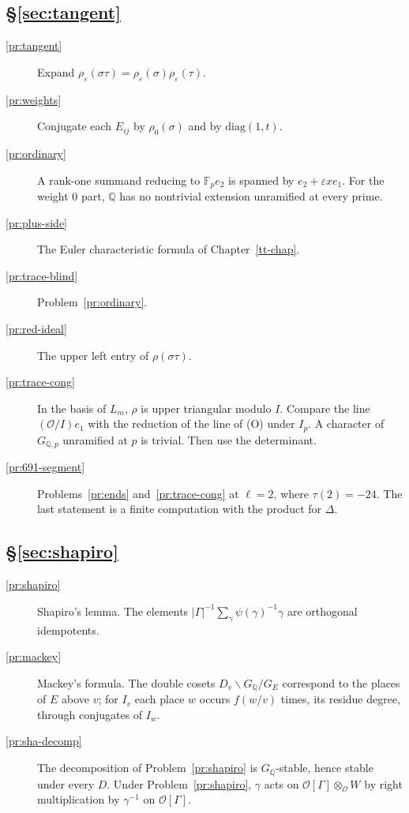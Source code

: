\documentclass[reqno]{amsart}
\newcounter{chap}
\theoremstyle{definition}
\theoremstyle{plain}
\newcommand{\Q}{\mathbb{Q}}
\newcommand{\F}{\mathbb{F}}
\newcommand{\Oc}{\mathcal{O}}
\newcommand{\GQ}{G_{\Q,p}}
\begin{document}
\subsection*{\S\ref{sec:tangent}}
\begin{description}
\item[\ref{pr:tangent}] Expand \(\rho_\varepsilon(\sigma\tau) = \rho_\varepsilon(\sigma)\rho_\varepsilon(\tau)\).
\item[\ref{pr:weights}] Conjugate each \(E_{ij}\) by \(\rho_0(\sigma)\) and by \(\mathrm{diag}(1,t)\).
\item[\ref{pr:ordinary}] A rank-one summand reducing to \(\F_p e_2\) is spanned by \(e_2 + \varepsilon x e_1\).  For the weight \(0\) part, \(\Q\) has no nontrivial extension unramified at every prime.
\item[\ref{pr:plus-side}] The Euler characteristic formula of Chapter~\ref{tt-chap}.
\item[\ref{pr:trace-blind}] Problem~\ref{pr:ordinary}.
\item[\ref{pr:red-ideal}] The upper left entry of \(\rho(\sigma\tau)\).
\item[\ref{pr:trace-cong}] In the basis of \(L_m\), \(\rho\) is upper triangular modulo \(I\).  Compare the line \((\Oc/I)e_1\) with the reduction of the line of (O) under \(I_p\).  A character of \(\GQ\) unramified at \(p\) is trivial.  Then use the determinant.
\item[\ref{pr:691-segment}] Problems~\ref{pr:ends} and~\ref{pr:trace-cong} at \(\ell = 2\), where \(\tau(2) = -24\).  The last statement is a finite computation with the product for \(\Delta\).
\end{description}

\subsection*{\S\ref{sec:shapiro}}
\begin{description}
\item[\ref{pr:shapiro}] Shapiro's lemma.  The elements \(\lvert\Gamma\rvert^{-1}\sum_\gamma \psi(\gamma)^{-1}\gamma\) are orthogonal idempotents.
\item[\ref{pr:mackey}] Mackey's formula.  The double cosets \(D_v \backslash G_\Q / G_E\) correspond to the places of \(E\) above \(v\); for \(I_v\) each place \(w\) occurs \(f(w/v)\) times, its residue degree, through conjugates of \(I_w\).
\item[\ref{pr:sha-decomp}] The decomposition of Problem~\ref{pr:shapiro} is \(G_\Q\)-stable, hence stable under every \(D\).  Under Problem~\ref{pr:shapiro}, \(\gamma\) acts on \(\Oc[\Gamma] \otimes_\Oc W\) by right multiplication by \(\gamma^{-1}\) on \(\Oc[\Gamma]\).
\end{description}
\end{document}
